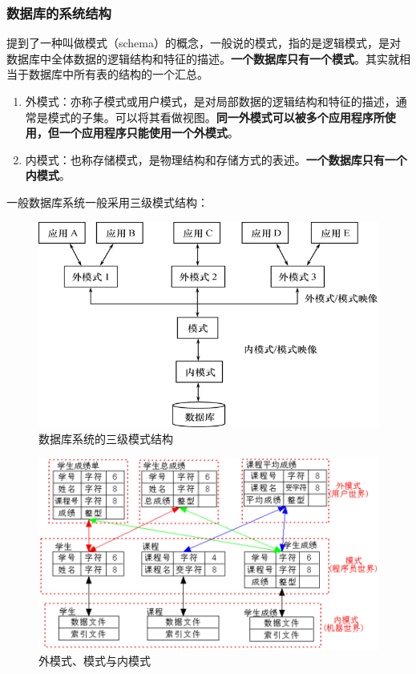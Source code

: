 \documentclass[chapter.computer_science.tex]{subfiles}
\begin{document}
\subsubsection{数据库的系统结构}
提到了一种叫做模式（schema）的概念，一般说的模式，指的是逻辑模式，是对数据库中全体数据的逻辑结构和特征的描述。{\bfseries 一个数据库只有一个模式}。其实就相当于数据库中所有表的结构的一个汇总。\\
\begin{enumerate}
    \item 外模式：亦称子模式或用户模式，是对局部数据的逻辑结构和特征的描述，通常是模式的子集。可以将其看做视图。{\bfseries 同一外模式可以被多个应用程序所使用，但一个应用程序只能使用一个外模式}。
    \item 内模式：也称存储模式，是物理结构和存储方式的表述。{\bfseries 一个数据库只有一个内模式}。
\end{enumerate}
一般数据库系统一般采用三级模式结构：
\begin{figure}[H]
    \centering
    \includegraphics[scale=0.5]{./images/0023.png}
    \caption{数据库系统的三级模式结构}
\end{figure}
\begin{figure}[H]
    \centering
    \includegraphics[scale=0.5]{./images/0024.png}
    \caption{外模式、模式与内模式}
\end{figure}
\end{document}
